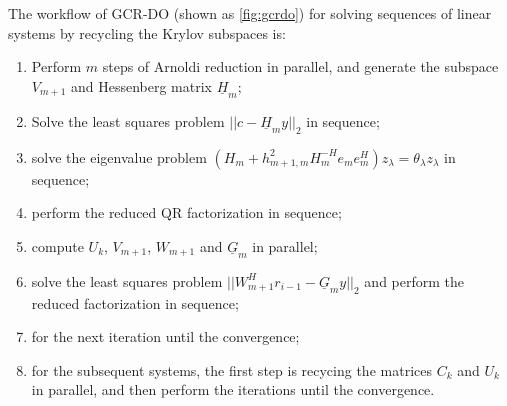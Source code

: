 The workflow of GCR-DO (shown as \ref{fig:gcrdo}) for solving sequences of linear systems by recycling the Krylov subspaces  is: 
\begin{enumerate}[label=(\arabic*)]
	\item Perform $m$ steps of Arnoldi reduction in parallel, and generate the subspace $V_{m+1}$ and Hessenberg matrix $\underline{H}_m$; 
	\item Solve the least squares problem $||c-\underline{H}_my||_2$ in sequence; 
	\item solve the eigenvalue problem $(H_m+h^2_{m+1,m}H_{m}^{-H}e_me_m^H)z_{\lambda}=\theta_{\lambda}z_{\lambda}$ in sequence; 
	\item perform the reduced QR factorization in sequence; 
	\item compute $U_k$, $V_{m+1}$, $W_{m+1}$ and $\underline{G}_m$ in parallel; 
	\item solve the least squares problem $||W^H_{m+1}r_{i-1}-\underline{G}_my||_2$ and perform the reduced factorization in sequence; 
	\item for the next iteration until the convergence; 
	\item for the subsequent systems, the first step is recycing the matrices $C_k$ and $U_k$ in parallel, and then perform the iterations until the convergence.
\end{enumerate}

